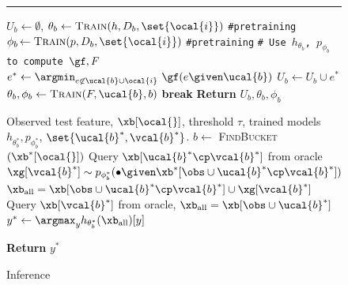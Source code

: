\documentclass[letterpaper]{article}
\begin{document}

 \begin{figure}[t]
 \begin{minipage}{0.46\textwidth}
\hrule
\small
\begin{algorithmic}[1]
    \STATE $U_b \leftarrow \emptyset$,
    \STATE $\theta_b  \gets \textsc{Train}(h, D_b,\set{\ocal{i}})$  \texttt{\small \#pretraining}
      \STATE $\phi_b \hspace{-0.5mm} \gets \textsc{Train}(p, D_b,\set{\ocal{i}})$ \texttt{\small\#pretraining}
          \STATE   \texttt{\small \# Use $h_{\theta _b }$, $p_{\phi _b}  $ to compute $\gf,F$ }
             \STATE $e^* \gets {\argmin}_{e\not\in \ucal{b}\cup \ocal{i}}\ \gf(e\given \ucal{b}) $
             \STATE $U_b \gets U_b \cup e^*$
              \STATE $\theta _b , \phi _b  \gets \textsc{Train}(F,\ucal{b},b)$
              \ELSE
              \STATE \textbf{break}
              \ENDIF
         \ENDFOR
        \STATE \textbf{Return} $U_b, \theta _b , \phi _b $
    \ENDFUNCTION
        \end{algorithmic}
\begin{algorithm}[H]
\small
\caption{Inference}
\begin{algorithmic}[1]
    \REQUIRE Observed test feature, $\xb[\ocal{}]$, threshold $\tau$, trained models $h_{\theta^* _b}, p_{\phi^*_b}$, $\set{\ucal{b} ^*,\vcal{b}^*}$.
    \STATE $b \leftarrow$ \textsc{FindBucket}$(\xb^*[\ocal{}])$
    \STATE Query $\xb[\ucal{b}^*\cp \vcal{b}^*]$ from oracle
    \STATE $\xg[\vcal{b}^*]\sim p_{\phi^* _b}(\bullet \given \xb^*[\obs\cup  \ucal{b}^* \cp \vcal{b}^*])$
    \STATE $\xb_{\text{all}}  = \xb[\obs\cup  \ucal{b} ^*\cp \vcal{b}^*]\cup \xg[\vcal{b}^*]$
        \STATE Query $\xb[\vcal{b}^*]$ from oracle,
        $\xb_{\text{all}}  = \xb[\obs\cup  \ucal{b}^*]$
    \ENDIF
         \STATE $y^* \leftarrow \argmax_{y} h_{\theta^* _b }(\xb_{\text{all}})[y]$

    \STATE \textbf{Return} $y^*$
\end{algorithmic}
\label{alg:inference}
\end{algorithm}
\end{minipage}
\end{figure}
\end{document}
